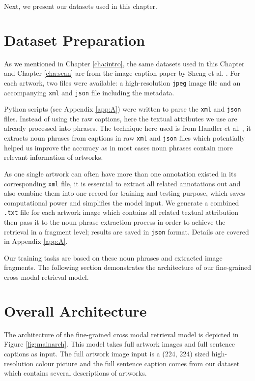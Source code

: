 Next, we present our datasets used in this chapter.

\section{Dataset Preparation}
\label{sec:dataprep}
As we mentioned in Chapter \ref{cha:intro}, the same datasets used in this Chapter and Chapter \ref{cha:scan} are from the image caption paper by Sheng et al. \cite{artworkcaption}. For each artwork, two files were available: a high-resolution \verb|jpeg| image file and an accompanying \verb|xml| and \verb|json| file including the metadata.

Python scripts (see Appendix \ref{app:A}) were written to parse the \verb|xml| and \verb|json| files. Instead of using the raw captions, here the textual attributes we use are already processed into phrases. The technique here used is from Handler et al. \cite{nounphrase}, it extracts noun phrases from captions in raw \verb|xml| and \verb|json| files which potentially helped us improve the accuracy as in most cases noun phrases contain more relevant information of artworks.  

As one single artwork can often have more than one annotation existed in its corresponding \verb|xml| file, it is essential to extract all related annotations out and also combine them into one record for training and testing purpose, which saves computational power and simplifies the model input. We generate a combined \verb|.txt| file for each artwork image which contains all related textual attribution then pass it to the noun phrase extraction process in order to achieve the retrieval in a fragment level; results are saved in \verb|json| format. Details are covered in Appendix \ref{app:A}.

Our training tasks are based on these noun phrases and extracted image fragments. The following section demonstrates the architecture of our fine-grained cross modal retrieval model.

\section{Overall Architecture}

The architecture of the fine-grained cross modal retrieval model is depicted in Figure \ref{fig:mainarch}. This model takes full artwork images and full sentence captions as input. The full artwork image input is a (224, 224) sized high-resolution colour picture and the full sentence caption comes from our dataset which contains several descriptions of artworks.

